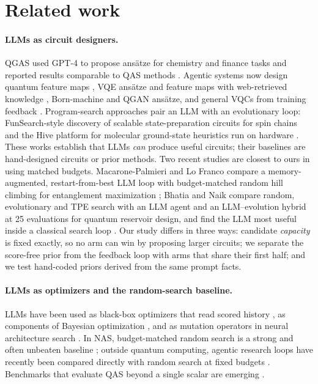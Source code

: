 \documentclass[11pt]{article}
\begin{document}
\section{Related work}
\label{sec:related}

\paragraph{LLMs as circuit designers.}
QGAS used GPT-4 to propose ans\"atze for chemistry and finance tasks and reported
results comparable to QAS methods \cite{liang2023qgas}.
Agentic systems now design quantum feature maps \cite{sakka2025featuremap}, VQE
ans\"atze and feature maps with web-retrieved knowledge \cite{sakka2026}, Born-machine
\cite{gujju2025qcbm} and QGAN \cite{ueda2025qgan} ans\"atze, and general VQCs from
training feedback \cite{knipfer2026}.
Program-search approaches pair an LLM with an evolutionary loop:
FunSearch-style discovery of scalable state-preparation circuits for spin chains
\cite{cao2025funsearch,romeraparedes2024funsearch} and the Hive platform for molecular
ground-state heuristics run on hardware \cite{finger2026hive}.
These works establish that LLMs \emph{can} produce useful circuits; their baselines
are hand-designed circuits or prior methods.
Two recent studies are closest to ours in using matched budgets.
Macarone-Palmieri and Lo Franco compare a memory-augmented, restart-from-best LLM
loop with budget-matched random hill climbing for entanglement maximization
\cite{macarone2026testtime}; Bhatia and Naik compare random, evolutionary and TPE
search with an LLM agent and an LLM--evolution hybrid at 25 evaluations for quantum
reservoir design, and find the LLM most useful inside a classical search loop
\cite{bhatia2026qrc}.
Our study differs in three ways: candidate \emph{capacity} is fixed exactly, so no
arm can win by proposing larger circuits; we separate the score-free prior from the
feedback loop with arms that share their first half; and we test hand-coded priors
derived from the same prompt facts.

\paragraph{LLMs as optimizers and the random-search baseline.}
LLMs have been used as black-box optimizers that read scored history
\cite{yang2024opro}, as components of Bayesian optimization \cite{liu2024llambo}, and
as mutation operators in neural architecture search \cite{chen2023evoprompting}.
In NAS, budget-matched random search is a strong and often unbeaten baseline
\cite{li2019randomnas,bergstra2012random}; outside quantum computing, agentic research
loops have recently been compared directly with random search at fixed budgets
\cite{li2026autoresearch}. Benchmarks that evaluate QAS beyond a single scalar are
emerging \cite{niu2026hamqasbench}.
\end{document}
